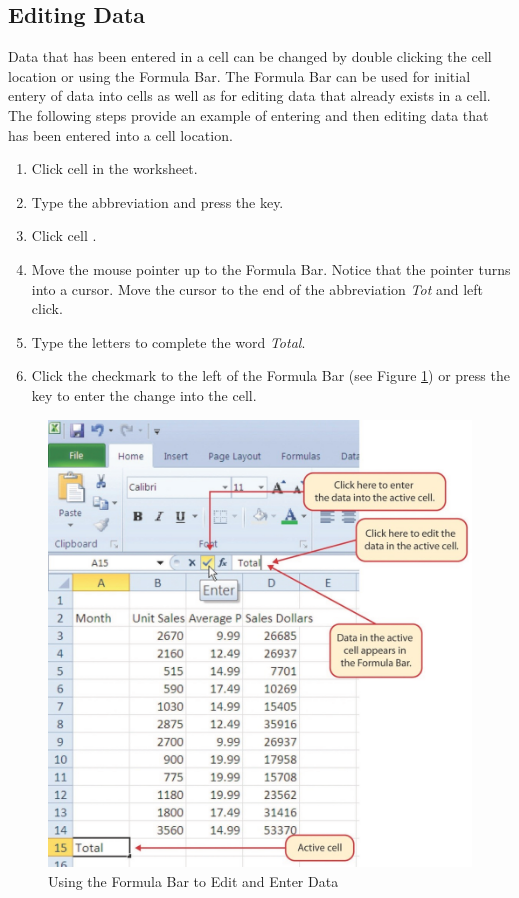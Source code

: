 \subsection{Editing Data}

Data that has been entered in a cell can be changed by double clicking the cell location or using the Formula Bar. The Formula Bar can be used for initial entery of data into cells as well as for editing data that already exists in a cell. The following steps provide an example of entering and then editing data that has been entered into a cell location.

\begin{enumerate}
	\item Click cell  in the  worksheet.
	\item Type the abbreviation  and press the  key.
	\item Click cell .
	\item Move the mouse pointer up to the Formula Bar. Notice that the pointer turns into a cursor. Move the cursor to the end of the abbreviation \textit{Tot} and left click.
	\item Type the letters  to complete the word \textit{Total}.
	\item Click the checkmark to the left of the Formula Bar (see Figure \ref{01:fig17}) or press the  key to enter the change into the cell.
\end{enumerate}

\begin{figure}[H]
	\centering
	\includegraphics[width=\maxwidth{.95\linewidth}]{gfx/ch01_fig17}
	\caption{Using the Formula Bar to Edit and Enter Data}
	\label{01:fig17}
\end{figure}

